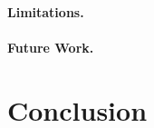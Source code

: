 \documentclass[11pt]{article}
\begin{document}

\paragraph{Limitations.}

\paragraph{Future Work.}

\section{Conclusion}
\label{sec:conclusion}




\end{document}
